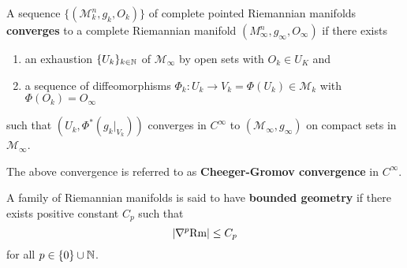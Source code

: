\begin{defn}
    A sequence $ \{ (\mathcal{M}^{n}_{k},g_{k},O_{k})\} $ of complete pointed Riemannian manifolds \textbf{converges} to a complete Riemannian manifold $ (M_{\infty}^{n}, g_{\infty}, O_{\infty}) $ if there exists \begin{enumerate}
        \item an exhaustion $ \{U_{k}\}_{k \in \mathbb{N}} $ of $ \mathcal{M}_{\infty} $ by open sets with $ O_{k} \in U_{K} $ and 
        \item a sequence of diffeomorphisms $ \Phi_{k} : U_{k} \to V_{k} = \Phi(U_{k}) \in \mathcal{M}_{k} $ with $ \Phi(O_{k}) = O_{\infty} $
    \end{enumerate}
    such that $ (U_{k},\Phi^{*}(g_{k}|_{V_{k}})) $ converges in $ C^{\infty} $ to $ (\mathcal{M}_{\infty}, g_{\infty}) $ on compact sets in $ \mathcal{M}_{\infty} $.
\end{defn}

The above convergence is referred to as \textbf{Cheeger-Gromov convergence} in $ C^{\infty} $.

\begin{defn}
    A family of Riemannian manifolds is said to have \textbf{bounded geometry} if there exists positive constant $ C_{p} $ such that 
    \[ |\nabla^{p} \text{Rm}| \le C_{p} \]
    for all $ p \in \{0\} \cup \mathbb{N} $.
\end{defn}

\begin{thm}
    
\end{thm}
\section{}